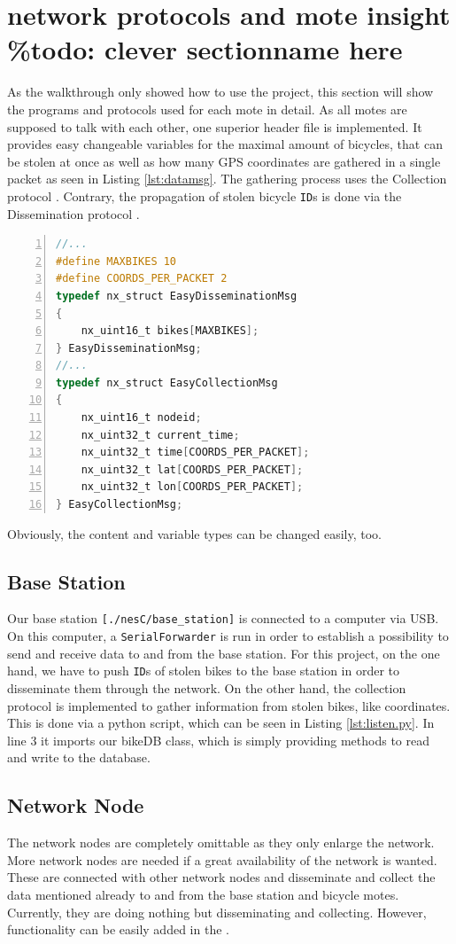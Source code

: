 \documentclass[a4paper]{article}
\begin{document}
\section{network protocols and mote insight \%todo: clever sectionname here}\label{sec:insight}
As the walkthrough only showed how to use the project, this section will show the programs and protocols used for each mote in detail. As all motes are supposed to talk with each other, one superior header file is implemented. It provides easy changeable variables for the maximal amount of bicycles, that can be stolen at once as well as how many GPS coordinates are gathered in a single packet as seen in Listing \ref{lst:datamsg}. The gathering process uses the Collection protocol \cite{colldiss}. Contrary, the propagation of stolen bicycle \texttt{ID}s is done via the Dissemination protocol \cite{colldiss}. 
\begin{lstlisting}[numbers=left, frame=single,language=C, captionpos=b, caption={DataMsg.h, content of packets}, label=lst:datamsg]
//...
#define MAXBIKES 10
#define COORDS_PER_PACKET 2
typedef nx_struct EasyDisseminationMsg 
{
    nx_uint16_t bikes[MAXBIKES];
} EasyDisseminationMsg;
//...
typedef nx_struct EasyCollectionMsg 
{
    nx_uint16_t nodeid;
    nx_uint32_t current_time;
    nx_uint32_t time[COORDS_PER_PACKET];
    nx_uint32_t lat[COORDS_PER_PACKET];
    nx_uint32_t lon[COORDS_PER_PACKET];
} EasyCollectionMsg;
\end{lstlisting}
Obviously, the content and variable types can be changed easily, too.
\subsection{Base Station}
Our base station \texttt{[./nesC/base\_station]} is connected to a computer via USB. On this computer, a \texttt{SerialForwarder} is run in order to establish a possibility to send and receive data to and from the base station. For this project, on the one hand, we have to push \texttt{ID}s of stolen bikes to the base station in order to disseminate them through the network. On the other hand, the collection protocol is implemented to gather information from stolen bikes, like coordinates. This is done via a python script, which can be seen in Listing \ref{lst:listen.py}. In line 3 it imports our bikeDB class, which is simply providing methods to read and write to the database.\\

\subsection{Network Node}
The network nodes are completely omittable as they only enlarge the network. More network nodes are needed if a great availability of the network is wanted. These are connected with other network nodes and disseminate and collect the data mentioned already to and from the base station and bicycle motes. Currently, they are doing nothing but disseminating and collecting. However, functionality can be easily added in the \texttt{}.
\end{document}
